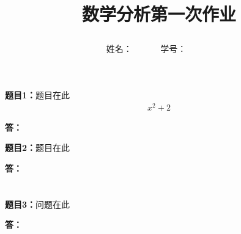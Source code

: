 \documentclass[12pt,a4paper]{article}
\begin{document}
\title{
{\heiti\fontsize{35pt}{10pt} 数学分析第一次作业

}
}
\date{}

\author{
姓名：\underline{}~~~~~~
学号：\underline{}~~~~~~}

\maketitle

\noindent
\section*{\heiti \color{red}{知识点:}}
\noindent
{\bf 题目1：}题目在此
\begin{align}
x^2+2
\end{align}


\vspace{5pt}
\noindent
{\bf 答：}

\vspace{10pt}
\noindent
{\bf 题目2：}题目在此

\vspace{5pt}
\noindent
{\bf 答：}
\noindent
\section*{\heiti \color{red}{知识点:}}
\vspace{10pt}
\noindent
{\bf 题目3：}问题在此



\vspace{5pt}
\noindent
{\bf 答：}
\end{document}

